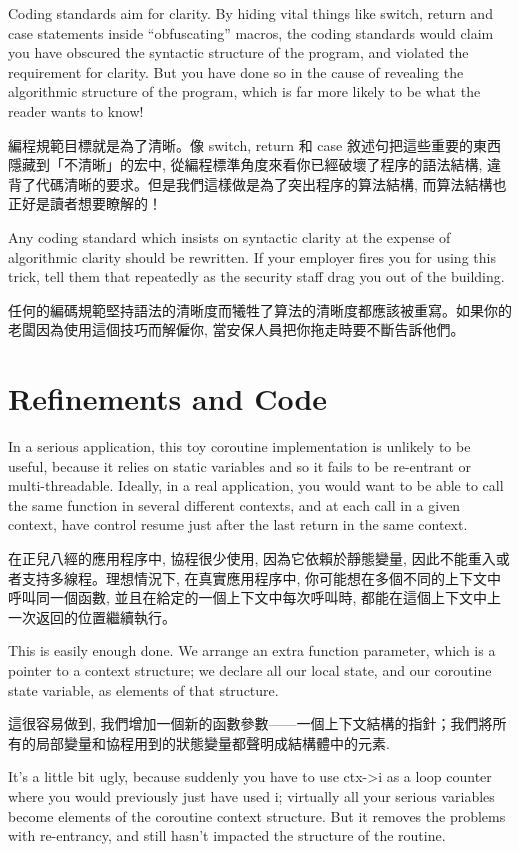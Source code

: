 \documentclass[12pt]{article}
\begin{document}
\begin{CJK}{UTF8}{bsmi}
Coding standards aim for clarity. By hiding vital things like switch, return and case statements inside ``obfuscating'' macros, the coding standards would claim you have obscured the syntactic structure of the program, and violated the requirement for clarity. But you have done so in the cause of revealing the algorithmic structure of the program, which is far more likely to be what the reader wants to know!

編程規範目標就是為了清晰。像 switch, return 和 case 敘述句把這些重要的東西隱藏到「不清晰」的宏中, 從編程標準角度來看你已經破壞了程序的語法結構, 違背了代碼清晰的要求。但是我們這樣做是為了突出程序的算法結構, 而算法結構也正好是讀者想要瞭解的！

Any coding standard which insists on syntactic clarity at the expense of algorithmic clarity should be rewritten. If your employer fires you for using this trick, tell them that repeatedly as the security staff drag you out of the building.

 任何的編碼規範堅持語法的清晰度而犧牲了算法的清晰度都應該被重寫。如果你的老闆因為使用這個技巧而解僱你, 當安保人員把你拖走時要不斷告訴他們。 
\section{Refinements and Code}

In a serious application, this toy coroutine implementation is unlikely to be useful, because it relies on static variables and so it fails to be re-entrant or multi-threadable. Ideally, in a real application, you would want to be able to call the same function in several different contexts, and at each call in a given context, have control resume just after the last return in the same context.

 在正兒八經的應用程序中, 協程很少使用, 因為它依賴於靜態變量, 因此不能重入或者支持多線程。理想情況下, 在真實應用程序中, 你可能想在多個不同的上下文中呼叫同一個函數, 並且在給定的一個上下文中每次呼叫時, 都能在這個上下文中上一次返回的位置繼續執行。 

This is easily enough done. We arrange an extra function parameter, which is a pointer to a context structure; we declare all our local state, and our coroutine state variable, as elements of that structure.

 這很容易做到, 我們增加一個新的函數參數——一個上下文結構的指針；我們將所有的局部變量和協程用到的狀態變量都聲明成結構體中的元素. 

It's a little bit ugly, because suddenly you have to use ctx->i as a loop counter where you would previously just have used i; virtually all your serious variables become elements of the coroutine context structure. But it removes the problems with re-entrancy, and still hasn't impacted the structure of the routine.


\end{CJK}
\end{document}
